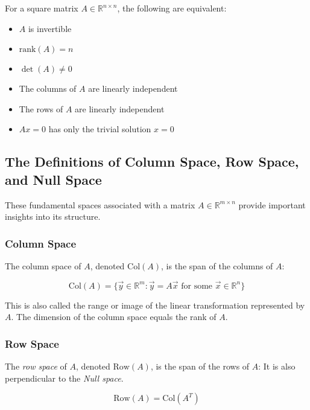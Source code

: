 For a square matrix \(A \in \mathbb{R}^{n \times n}\), the following are equivalent:
\begin{itemize}[label=\(-\)]
    \item \(A\) is invertible
    \item \(\text{rank}(A) = n\)
    \item \(\det(A) \neq 0\)
    \item The columns of \(A\) are linearly independent
    \item The rows of \(A\) are linearly independent
    \item \(Ax = 0\) has only the trivial solution \(x = 0\)
\end{itemize}

\subsection{The Definitions of Column Space, Row Space, and Null Space}

These fundamental spaces associated with a matrix \(A \in \mathbb{R}^{m \times n}\) provide important insights into its structure.

\subsubsection{Column Space}

The column space of \(A\), denoted \(\text{Col}(A)\), is the span of the columns of \(A\):

\begin{equation*}
\text{Col}(A) = \{\vec{y} \in \mathbb{R}^m : \vec{y} = A\vec{x} \text{ for some } \vec{x} \in \mathbb{R}^n\}
\end{equation*}

This is also called the range or image of the linear transformation represented by \(A\). The dimension of the column space equals the rank of \(A\).

\subsubsection{Row Space}

The \emph{row space} of \(A\), denoted \(\text{Row}(A)\), is the span of the rows of \(A\):
 It is also perpendicular to the \emph{Null space}.

\begin{equation*}
\text{Row}(A) = \text{Col}(A^T)
\end{equation*}


